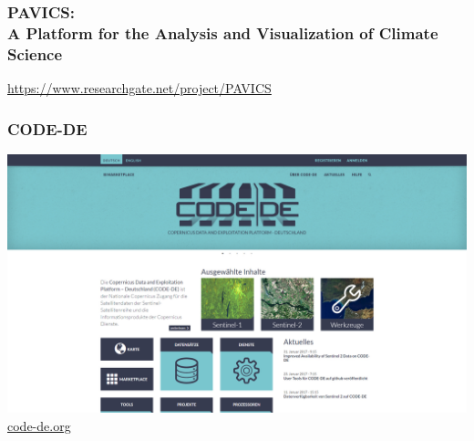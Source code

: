 \begin{frame}
  \frametitle{PAVICS: \\ A Platform for the Analysis and Visualization of Climate Science}


  

  \vspace{6cm}
  \centering
  \footnotesize{\url{https://www.researchgate.net/project/PAVICS}}
\end{frame}


\begin{frame}
  \frametitle{CODE-DE} 
	\includegraphics[width=1\textwidth]{images/cde_screen_0001_portal.jpg}\\
    
\href{https://code-de.org/}{code-de.org}
\end{frame}


